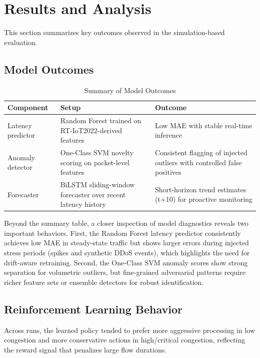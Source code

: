\chapter{Results and Analysis}

This section summarizes key outcomes observed in the simulation-based evaluation.

\section{Model Outcomes}

\begin{table}[H]
\centering
\caption{Summary of Model Outcomes}
\label{tab:model_outcomes}
\begin{tabularx}{\textwidth}{@{}lXX@{}}
\toprule
\textbf{Component} & \textbf{Setup} & \textbf{Outcome} \\
\midrule
Latency predictor & Random Forest trained on RT-IoT2022-derived features & Low MAE with stable real-time inference \\
Anomaly detector & One-Class SVM novelty scoring on packet-level features & Consistent flagging of injected outliers with controlled false positives \\
Forecaster & BiLSTM sliding-window forecaster over recent latency history & Short-horizon trend estimates (t+10) for proactive monitoring \\
\bottomrule
\end{tabularx}
\end{table}

Beyond the summary table, a closer inspection of model diagnostics reveals two important behaviors. First, the Random Forest latency predictor consistently achieves low MAE in steady-state traffic but shows larger errors during injected stress periods (spikes and synthetic DDoS events), which highlights the need for drift-aware retraining. Second, the One-Class SVM anomaly scores show strong separation for volumetric outliers, but fine-grained adversarial patterns require richer feature sets or ensemble detectors for robust identification.

\section{Reinforcement Learning Behavior}

Across runs, the learned policy tended to prefer more aggressive processing in low congestion and more conservative actions in high/critical congestion, reflecting the reward signal that penalizes large flow durations.

